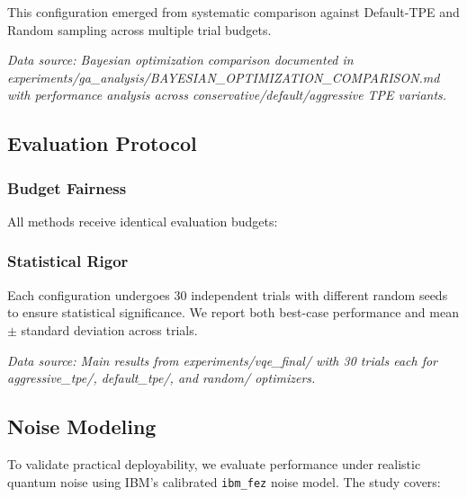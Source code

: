 This configuration emerged from systematic comparison against Default-TPE and Random sampling across multiple trial budgets.

\textit{Data source: Bayesian optimization comparison documented in experiments/ga\_analysis/BAYESIAN\_OPTIMIZATION\_COMPARISON.md with performance analysis across conservative/default/aggressive TPE variants.}

\subsection{Evaluation Protocol}

\subsubsection{Budget Fairness}
All methods receive identical evaluation budgets:

\subsubsection{Statistical Rigor}
Each configuration undergoes 30 independent trials with different random seeds to ensure statistical significance.
We report both best-case performance and mean $\pm$ standard deviation across trials.

\textit{Data source: Main results from experiments/vqe\_final/ with 30 trials each for aggressive\_tpe/, default\_tpe/, and random/ optimizers.}

\subsection{Noise Modeling}

To validate practical deployability, we evaluate performance under realistic quantum noise using IBM's calibrated \texttt{ibm\_fez} noise model.
The study covers:

